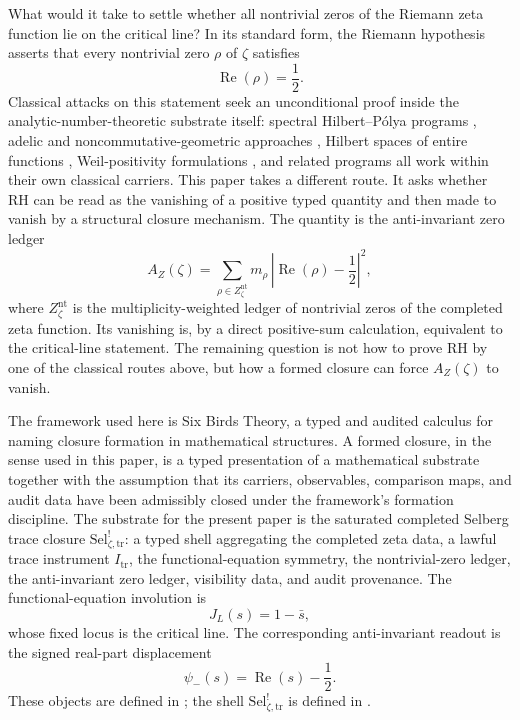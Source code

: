\documentclass[11pt]{article}
\DeclareMathOperator{\Real}{Re}
\newcommand{\JL}{J_{L}}
\newcommand{\psimRH}{\psi_{-}}
\newcommand{\Znt}{Z_{\zeta}^{\mathrm{nt}}}
\newcommand{\AZ}{A_{Z}(\zeta)}
\newcommand{\Sel}{\mathrm{Sel}^{!}_{\zeta,\mathrm{tr}}}
\newcommand{\Itr}{I_{\mathrm{tr}}}
\theoremstyle{definition}
\begin{document}
What would it take to settle whether all nontrivial zeros of the
Riemann zeta function lie on the critical line?  In its standard
form, the Riemann hypothesis~\citep{Riemann1859} asserts that every
nontrivial zero \(\rho\) of \(\zeta\) satisfies
\[
  \Real(\rho)=\frac12.
\]
Classical attacks on this statement seek an unconditional proof
inside the analytic-number-theoretic substrate itself: spectral
Hilbert--P\'olya programs \citep{BerryKeating1990,Odlyzko1987},
adelic and noncommutative-geometric approaches
\citep{Connes1999}, Hilbert spaces of entire functions
\citep{deBranges1968,deBranges1986}, Weil-positivity formulations
\citep{Weil1952,Bombieri2000}, and related programs all work within
their own classical carriers.  This paper
takes a different route.  It asks whether RH can be read as the
vanishing of a positive typed quantity and then made to vanish by a
structural closure mechanism.  The quantity is the anti-invariant zero
ledger
\[
  \AZ=\sum_{\rho\in \Znt} m_\rho\,
       \left|\Real(\rho)-\frac12\right|^2,
\]
where \(\Znt\) is the multiplicity-weighted ledger of nontrivial zeros
of the completed zeta function.  Its vanishing is, by a direct
positive-sum calculation, equivalent to the critical-line statement.
The remaining question is not how to prove RH by one of the classical
routes above, but how a formed closure can force \(\AZ\) to vanish.

The framework used here is Six Birds Theory, a typed and audited
calculus for naming closure formation in mathematical structures.  A
formed closure, in the sense used in this paper, is a typed presentation
of a mathematical substrate together with the assumption that its
carriers, observables, comparison maps, and audit data have been
admissibly closed under the framework's formation discipline.  The
substrate for the present paper is the saturated completed Selberg trace
closure \(\Sel\): a typed shell aggregating the completed zeta data, a
lawful trace instrument \(\Itr\), the functional-equation symmetry, the
nontrivial-zero ledger, the anti-invariant zero ledger, visibility data,
and audit provenance.  The functional-equation involution is
\[
  \JL(s)=1-\bar{s},
\]
whose fixed locus is the critical line.  The corresponding
anti-invariant readout is the signed real-part displacement
\[
  \psimRH(s)=\Real(s)-\frac12.
\]
These objects are defined in ; the
shell \(\Sel\) is defined in .
\end{document}
